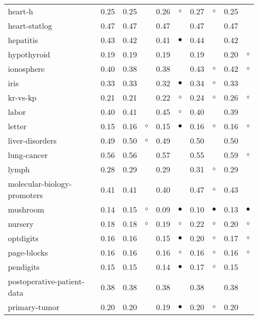 {\begin{longtable}{lrr@{\hspace{0.1cm}}cr@{\hspace{0.1cm}}cr@{\hspace{0.1cm}}cr@{\hspace{0.1cm}}c}
heart-h & 0.25 & 0.25 &           & 0.26 &   $\circ$ & 0.27 &   $\circ$ & 0.25 &          \\
heart-statlog & 0.47 & 0.47 &           & 0.47 &           & 0.47 &           & 0.47 &          \\
hepatitis & 0.43 & 0.42 &           & 0.41 & $\bullet$ & 0.44 &           & 0.42 &          \\
hypothyroid & 0.19 & 0.19 &           & 0.19 &           & 0.19 &           & 0.20 &   $\circ$\\
ionosphere & 0.40 & 0.38 &           & 0.38 &           & 0.43 &   $\circ$ & 0.42 &   $\circ$\\
iris & 0.33 & 0.33 &           & 0.32 & $\bullet$ & 0.34 &   $\circ$ & 0.33 &          \\
kr-vs-kp & 0.21 & 0.21 &           & 0.22 &   $\circ$ & 0.24 &   $\circ$ & 0.26 &   $\circ$\\
labor & 0.40 & 0.41 &           & 0.45 &   $\circ$ & 0.40 &           & 0.39 &          \\
letter & 0.15 & 0.16 &   $\circ$ & 0.15 & $\bullet$ & 0.16 &   $\circ$ & 0.16 &   $\circ$\\
liver-disorders & 0.49 & 0.50 &   $\circ$ & 0.49 &           & 0.50 &           & 0.50 &          \\
lung-cancer & 0.56 & 0.56 &           & 0.57 &           & 0.55 &           & 0.59 &   $\circ$\\
lymph & 0.28 & 0.29 &           & 0.29 &           & 0.31 &   $\circ$ & 0.29 &          \\
molecular-biology-promoters & 0.41 & 0.41 &           & 0.40 &           & 0.47 &   $\circ$ & 0.43 &          \\
mushroom & 0.14 & 0.15 &   $\circ$ & 0.09 & $\bullet$ & 0.10 & $\bullet$ & 0.13 & $\bullet$\\
nursery & 0.18 & 0.18 &   $\circ$ & 0.19 &   $\circ$ & 0.22 &   $\circ$ & 0.20 &   $\circ$\\
optdigits & 0.16 & 0.16 &           & 0.15 & $\bullet$ & 0.20 &   $\circ$ & 0.17 &   $\circ$\\
page-blocks & 0.16 & 0.16 &           & 0.16 &   $\circ$ & 0.16 &   $\circ$ & 0.16 &   $\circ$\\
pendigits & 0.15 & 0.15 &           & 0.14 & $\bullet$ & 0.17 &   $\circ$ & 0.15 &          \\
postoperative-patient-data & 0.38 & 0.38 &           & 0.38 &           & 0.38 &           & 0.38 &          \\
primary-tumor & 0.20 & 0.20 &           & 0.19 & $\bullet$ & 0.20 &   $\circ$ & 0.20 &          \\

\end{longtable}}
